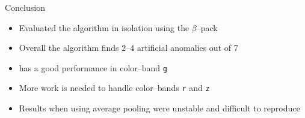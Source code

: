 
\begin{frame}{Conclusion}
    \begin{itemize}
        \item Evaluated the \mlblink algorithm in isolation using the $\beta$--pack
        \item Overall the \mlblink algorithm finds 2--4 artificial anomalies out of 7
        \item \mlblink has a good performance in \panstarrs color--band \texttt{g}
        \item More work is needed to handle \panstarrs color--bands \texttt{r} and \texttt{z}
        \item Results when using average pooling were unstable and difficult to reproduce
    \end{itemize}
\end{frame}